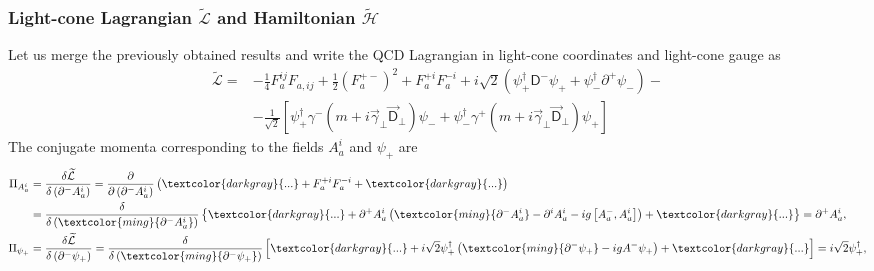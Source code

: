\subsubsection*{Light-cone Lagrangian $\widetilde{\mathcal{L}}$ and Hamiltonian $\widetilde{\mathcal{H}}$}
Let us merge the previously obtained results and write the QCD Lagrangian in light-cone coordinates and light-cone gauge as
\begin{align*}
\widetilde{\mathcal{L}}=&-\frac{1}{4}F^{ij}_aF_{a,ij}+\frac{1}{2}\left(F^{+-}_a\right)^2+F_a^{+i}F_a^{-i}+i\sqrt{2}\left(\psi_+^\dag\textsf{D}^-\psi_++\psi_-^\dag\partial^+\psi_-\right)-\\
&-\frac{1}{\sqrt{2}}\left[\psi_+^\dag\gamma^-\left(m+i\vec{\gamma}_\perp\vec{\textsf{D}}_\perp\right)\psi_-+\psi_-^\dag\gamma^+\left(m+i\vec{\gamma}_\perp\vec{\textsf{D}}_\perp\right)\psi_+\right]
\end{align*}
The conjugate momenta corresponding to the fields $A_a^i$ and $\psi_+$ are
\begin{subequations}
\begin{align}
\label{lc38a}\Pi_{A_a^i}&=\frac{\delta\widetilde{\mathcal{L}}}{\delta\left(\partial^-A_a^i\right)}=\frac{\partial}{\partial\left(\partial^-A_a^i\right)}\left(\textcolor{darkgray}{...}+F_a^{+i}F_a^{-i}+\textcolor{darkgray}{...}\right)\\
&=\frac{\delta}{\delta\left(\textcolor{ming}{\partial^-A_a^i}\right)}\left\lbrace\textcolor{darkgray}{...}+\partial^+A_a^i\left(\textcolor{ming}{\partial^-A_a^i}-\partial^iA_a^i-ig\left[A_a^-,A_a^i\right]\right)+\textcolor{darkgray}{...}\right\rbrace=\partial^+A_a^i,\\
\label{lc38b}\Pi_{\psi_+}&=\frac{\delta\widetilde{\mathcal{L}}}{\delta\left(\partial^-\psi_+\right)}=\frac{\delta}{\delta\left(\textcolor{ming}{\partial^-\psi_+}\right)}\left[\textcolor{darkgray}{...}+i\sqrt{2}\psi_+^\dag\left(\textcolor{ming}{\partial^-\psi_+}-igA^-\psi_+\right)+\textcolor{darkgray}{...}\right]=i\sqrt{2}\psi_+^\dag,
\end{align}
\end{subequations}

